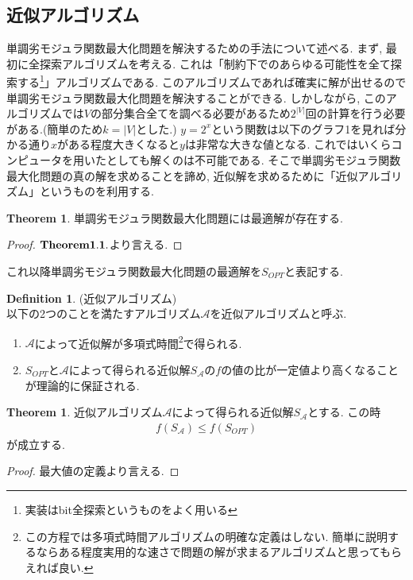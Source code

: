 \documentclass[11pt, a4paper, dvipdfmx]{jsarticle}
\theoremstyle{definition}
\newtheorem{Definition+}[Axiom+]{Definition}
\newtheorem{Theorem+}[Axiom+]{Theorem}
\begin{document}
 \subsection{近似アルゴリズム}
単調劣モジュラ関数最大化問題を解決するための手法について述べる. 
まず, 最初に全探索アルゴリズムを考える. これは「制約下でのあらゆる可能性を全て探索する\footnote{実装はbit全探索というものをよく用いる}」アルゴリズムである. 
このアルゴリズムであれば確実に解が出せるので単調劣モジュラ関数最大化問題を解決することができる. 
しかしながら, このアルゴリズムでは$V$の部分集合全てを調べる必要があるため$2^{|V|}$回の計算を行う必要がある.(簡単のため$k = |V|$とした.)
$y = 2^x$という関数は以下のグラフ1を見れば分かる通り$x$がある程度大きくなると$y$は非常な大きな値となる. 
これではいくらコンピュータを用いたとしても解くのは不可能である. そこで単調劣モジュラ関数最大化問題の真の解を求めることを諦め,
近似解を求めるために「近似アルゴリズム」というものを利用する. 
\begin{Theorem+}
    単調劣モジュラ関数最大化問題には最適解が存在する.
\begin{proof}
    ${\bf Theorem 1.1.}$より言える.
\end{proof}
これ以降単調劣モジュラ関数最大化問題の最適解を$S_{OPT}$と表記する.
\end{Theorem+}
\begin{Definition+}(近似アルゴリズム)\\
    以下の2つのことを満たすアルゴリズム$\mathcal{A}$を近似アルゴリズムと呼ぶ.
    \begin{enumerate}
        \item $\mathcal{A}$によって近似解が多項式時間\footnote{この方程では多項式時間アルゴリズムの明確な定義はしない. 簡単に説明するならある程度実用的な速さで問題の解が求まるアルゴリズムと思ってもらえれば良い. }で得られる.
        \item $S_{OPT}$と$\mathcal{A}$によって得られる近似解$S_{\mathcal{A}}$の$f$の値の比が一定値より高くなることが理論的に保証される.
    \end{enumerate}
\end{Definition+}
\begin{Theorem+}
    近似アルゴリズム$\mathcal{A}$によって得られる近似解$S_{\mathcal{A}}$とする. この時
    \begin{align*}
        f(S_{\mathcal{A}})\leq f(S_{OPT})
    \end{align*}
    が成立する.
    \begin{proof}
        最大値の定義より言える.
    \end{proof}
\end{Theorem+}
\end{document}
